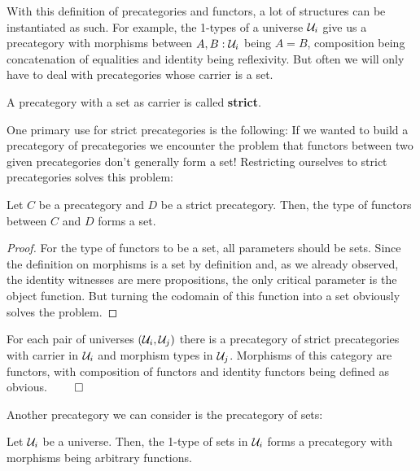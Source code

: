 With this definition of precategories and functors, a lot of structures can be
instantiated as such.
For example, the 1-types of a universe $\mathcal{U}_i$ give us a precategory with morphisms
between $A, B : \mathcal{U}_i$ being $A = B$, composition being concatenation of equalities
and identity being reflexivity.
But often we will only have to deal with precategories whose carrier is a set.

\begin{defn} \label{def:hott-strict-precat}
A precategory with a set as carrier is called \textbf{strict}.
\end{defn}

One primary use for strict precategories is the following:
If we wanted to build a precategory of precategories we encounter the problem that
functors between two given precategories don't generally form a set!
Restricting ourselves to strict precategories solves this problem:

\begin{lemma} \label{thm:functors-hset}
Let $C$ be a precategory and $D$ be a strict precategory.
Then, the type of functors between $C$ and $D$ forms a set.
\end{lemma}

\begin{proof}
For the type of functors to be a set, all parameters should be sets.
Since the definition on morphisms is a set by definition and,
as we already observed, the identity witnesses are mere propositions,
the only critical parameter is the object function.
But turning the codomain of this function into a set obviously solves the
problem.
\end{proof}

\begin{corollary} \label{thm:precat-strict-precat}
For each pair of universes $(\mathcal{U}_i, \mathcal{U}_j)$ there is a precategory of strict
precategories with carrier in $\mathcal{U}_i$ and morphism types in $\mathcal{U}_j$. Morphisms of
this category are functors, with composition of functors and identity functors
being defined as obvious. \hfill $\qed$
\end{corollary}

Another precategory we can consider is the precategory of sets:

\begin{lemma}
Let $\mathcal{U}_i$ be a universe. Then, the 1-type of sets in $\mathcal{U}_i$ forms a precategory
with morphisms being arbitrary functions.
\end{lemma}

